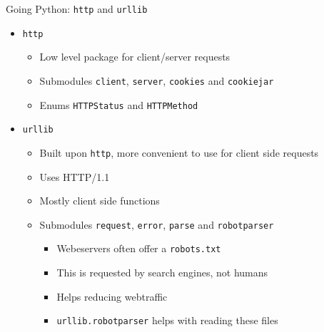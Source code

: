 
\begin{frame}{Going Python: \texttt{http} and \texttt{urllib}}
%
\begin{itemize}
\item \texttt{http}
	\begin{itemize}
	\item Low level package for client/server requests
	\item Submodules \texttt{client}, \texttt{server}, \texttt{cookies} and \texttt{cookiejar}
	\item Enums \texttt{HTTPStatus} and \texttt{HTTPMethod}
	\end{itemize}
\pause
\item \texttt{urllib}
	\begin{itemize}
	\item Built upon \texttt{http}, more convenient to use for client side requests
	\item Uses HTTP/1.1
	\item Mostly client side functions
	\item Submodules \texttt{request}, \texttt{error}, \texttt{parse} and \texttt{robotparser}
\pause
		\begin{itemize}
		\item Webeservers often offer a \texttt{robots.txt}
		\item This is requested by search engines, not humans
		\item Helps reducing webtraffic
		\item \texttt{urllib.robotparser} helps with reading these files
		\end{itemize}
	\end{itemize}
\end{itemize}
%
\end{frame}


